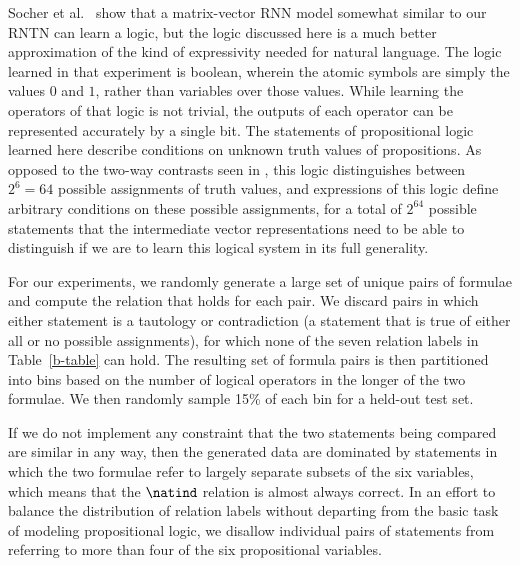 Socher et al.~\cite{socher2012semantic} show that a matrix-vector RNN
model somewhat similar to our RNTN can learn a logic, but the logic
discussed here is a much better approximation of the kind of
expressivity needed for natural language. The logic learned in that
experiment is boolean, wherein the atomic symbols are simply the
values $0$ and $1$, rather than variables over those values. While
learning the operators of that logic is not trivial, the outputs of
each operator can be represented accurately by a single bit. The
statements of propositional logic learned here describe conditions on
unknown truth values of propositions. As opposed to the two-way
contrasts seen in \cite{socher2012semantic}, this logic distinguishes
between $2^{6} = 64$ possible assignments of truth values, and
expressions of this logic define arbitrary conditions on these
possible assignments, for a total of $2^{64}$ %
possible statements that the intermediate vector representations need
to be able to distinguish if we are to learn this logical system in its
full generality.

For our experiments, we randomly generate a large set of  unique pairs 
of formulae and compute the relation that holds for each pair.
We discard pairs in which either statement is a tautology or
contradiction (a statement that is true of either all or no possible
assignments), for which none of the seven relation labels in
Table~\ref{b-table} can hold. The resulting set of formula pairs is
then partitioned into bins based on the number of logical operators in
the longer of the two formulae. We then randomly sample 15\% of each
bin for a held-out test set.

If we do not implement any constraint that the two statements being
compared are similar in any way, then the generated data are dominated
by statements in which the two formulae refer to largely separate
subsets of the six variables, which means that the $\natind$ relation
is almost always correct.  In an effort to balance the distribution of
relation labels without departing from the basic task of modeling
propositional logic, we disallow individual pairs of statements from
referring to more than four of the six propositional variables.


